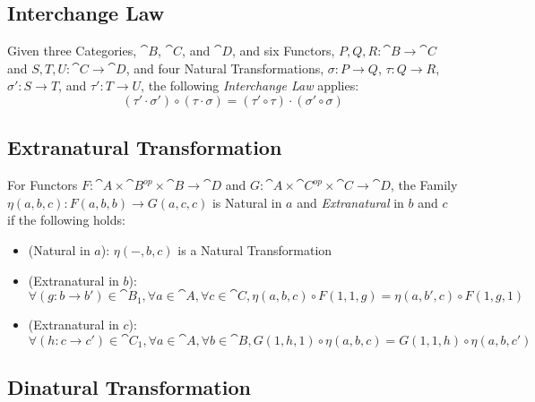 \subsection{Interchange Law}\label{sec:interchange_law}

Given three Categories, $\cat{B}$, $\cat{C}$, and $\cat{D}$,
and six Functors, $P,Q,R : \cat{B} \rightarrow \cat{C}$ and
$S,T,U : \cat{C} \rightarrow \cat{D}$, and four Natural
Transformations, $\sigma : P \rightarrow Q$, $\tau : Q \rightarrow R$,
$\sigma' : S \rightarrow T$, and $\tau' : T \rightarrow U$, the
following \emph{Interchange Law} applies:
\[
  (\tau' \cdot \sigma') \circ (\tau \cdot \sigma) =
  (\tau' \circ \tau) \cdot (\sigma' \circ \sigma)
\]



\subsection{Extranatural Transformation}
\label{sec:extranatural_transformation}

For Functors $F : \cat{A} \times \cat{B}^{op} \times \cat{B}
\rightarrow \cat{D}$ and $G : \cat{A} \times \cat{C}^{op} \times
\cat{C} \rightarrow \cat{D}$, the Family $\eta(a,b,c) : F(a,b,b)
\rightarrow G(a,c,c)$ is Natural in $a$ and \emph{Extranatural} in $b$
and $c$ if the following holds:
\begin{itemize}
  \item (Natural in $a$): $\eta (-,b,c)$ is a Natural Transformation
  \item (Extranatural in $b$): $\forall (g:b \rightarrow b') \in
    \cat{B}_1, \forall a \in \cat{A}, \forall c \in \cat{C},
    \eta(a,b,c) \circ F(1,1,g) = \eta(a,b',c) \circ F(1,g,1)$
  \item (Extranatural in $c$): $\forall (h:c \rightarrow c') \in
    \cat{C}_1, \forall a \in \cat{A}, \forall b \in \cat{B}, G(1,h,1)
    \circ \eta(a,b,c) = G(1,1,h) \circ \eta(a,b,c')$
\end{itemize}



\subsection{Dinatural Transformation}
\label{sec:dinatural_transformation}

